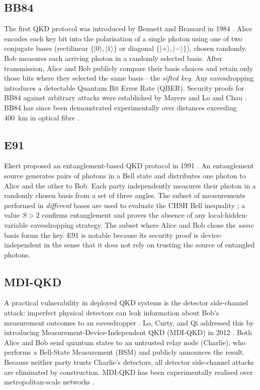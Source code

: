 \documentclass[conference]{IEEEtran}
\begin{document}
\subsection{BB84}

The first QKD protocol was introduced by Bennett and Brassard in 1984
\cite{bb84}. Alice encodes each key bit into the polarisation of a single
photon using one of two conjugate bases (rectilinear $\{|0\rangle,|1\rangle\}$
or diagonal $\{|+\rangle,|-\rangle\}$), chosen randomly. Bob measures each
arriving photon in a randomly selected basis. After transmission, Alice and
Bob publicly compare their basis choices and retain only those bits where they
selected the same basis---the \emph{sifted key}. Any eavesdropping
introduces a detectable Quantum Bit Error Rate (QBER). Security proofs for
BB84 against arbitrary attacks were established by Mayers \cite{mayers2001}
and Lo and Chau \cite{lo1999}. BB84 has since been demonstrated experimentally
over distances exceeding 400~km in optical fibre \cite{boaron2018}.

\subsection{E91}

Ekert proposed an entanglement-based QKD protocol in 1991 \cite{e91}.
An entanglement source generates pairs of photons in a Bell state and
distributes one photon to Alice and the other to Bob. Each party independently
measures their photon in a randomly chosen basis from a set of three angles.
The subset of measurements performed in \emph{different} bases are used to
evaluate the CHSH Bell inequality \cite{chsh1969}; a value $S > 2$ confirms
entanglement and proves the absence of any local-hidden-variable eavesdropping
strategy. The subset where Alice and Bob chose the \emph{same} basis forms the
key. E91 is notable because its security proof is device-independent in the
sense that it does not rely on trusting the source of entangled photons.

\subsection{MDI-QKD}

A practical vulnerability in deployed QKD systems is the detector
side-channel attack: imperfect physical detectors can leak information
about Bob's measurement outcomes to an eavesdropper \cite{lydersen2010}.
Lo, Curty, and Qi addressed this by introducing
Measurement-Device-Independent QKD (MDI-QKD) in 2012 \cite{mdi2012}. Both
Alice and Bob send quantum states to an untrusted relay node (Charlie), who
performs a Bell-State Measurement (BSM) and publicly announces the result.
Because neither party trusts Charlie's detectors, all detector side-channel
attacks are eliminated by construction. MDI-QKD has been experimentally
realised over metropolitan-scale networks \cite{tang2016}.
\end{document}
